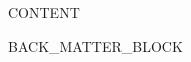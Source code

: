 \documentclass[12pt,openany]{book}
\begin{document}

{{CONTENT}}


\backmatter
{{BACK_MATTER_BLOCK}}



\clearpage
\thispagestyle{empty}\null\clearpage
\ifodd\value{page}\else\thispagestyle{empty}\null\clearpage\fi
\end{document}
